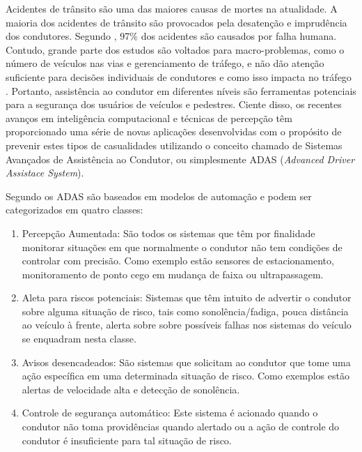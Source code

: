 Acidentes de trânsito são uma das maiores causas de mortes na atualidade. A maioria dos acidentes de trânsito são provocados pela desatenção e imprudência dos condutores. Segundo , 97\% dos acidentes são causados por falha humana. Contudo, grande parte dos estudos são voltados para macro-problemas, como o número de veículos nas vias e gerenciamento de tráfego, e não dão atenção suficiente para decisões individuais de condutores e como isso impacta no tráfego \cite{Carmona2015}. 
Portanto, assistência ao condutor em diferentes níveis são ferramentas potenciais para a segurança dos usuários de veículos e pedestres. Ciente disso, os recentes avanços em inteligência computacional e técnicas de percepção têm proporcionado uma série de novas aplicações desenvolvidas com o propósito de prevenir estes tipos de casualidades utilizando o conceito chamado de Sistemas Avançados de Assistência ao Condutor, ou simplesmente ADAS (\textit{Advanced Driver Assistace System}). 

Segundo  os ADAS são baseados em modelos de automação e podem ser categorizados em quatro classes:

\begin{enumerate}
	\item Percepção Aumentada: São todos os sistemas que têm por finalidade monitorar situações em que normalmente o condutor não tem condições de controlar com precisão. Como exemplo estão sensores de estacionamento, monitoramento de ponto cego em mudança de faixa ou ultrapassagem. 
	
	\item Aleta para riscos potenciais: Sistemas que têm intuito de advertir o condutor sobre alguma situação de risco, tais como sonolência/fadiga, pouca distância ao veículo à frente, alerta sobre sobre possíveis falhas nos sistemas do veículo se enquadram nesta classe.
	
	\item Avisos desencadeados: São sistemas que solicitam ao condutor que tome uma ação específica em uma determinada situação de risco. Como exemplos estão alertas de velocidade alta e detecção de sonolência.
	
	\item Controle de segurança automático: Este sistema é acionado quando o condutor não toma providências quando alertado ou a ação de controle do condutor é insuficiente para tal situação de risco.
	
\end{enumerate}

